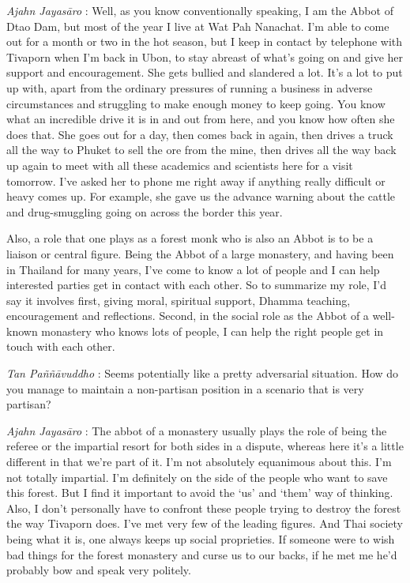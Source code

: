 \emph{Ajahn Jayasāro }: Well, as you know conventionally speaking, I am
the Abbot of Dtao Dam, but most of the year I live at Wat Pah Nanachat.
I'm able to come out for a month or two in the hot season, but I keep in
contact by telephone with Tivaporn when I'm back in Ubon, to stay
abreast of what's going on and give her support and encouragement. She
gets bullied and slandered a lot. It's a lot to put up with, apart from
the ordinary pressures of running a business in adverse circumstances
and struggling to make enough money to keep going. You know what an
incredible drive it is in and out from here, and you know how often she
does that. She goes out for a day, then comes back in again, then drives
a truck all the way to Phuket to sell the ore from the mine, then drives
all the way back up again to meet with all these academics and
scientists here for a visit tomorrow. I've asked her to phone me right
away if anything really difficult or heavy comes up. For example, she
gave us the advance warning about the cattle and drug-smuggling going on
across the border this year.

Also, a role that one plays as a forest monk who is also an Abbot is to
be a liaison or central figure. Being the Abbot of a large monastery,
and having been in Thailand for many years, I've come to know a lot of
people and I can help interested parties get in contact with each other.
So to summarize my role, I'd say it involves first, giving moral,
spiritual support, Dhamma teaching, encouragement and reflections.
Second, in the social role as the Abbot of a well-known monastery who
knows lots of people, I can help the right people get in touch with each
other.

\emph{Tan Paññāvuddho} : Seems potentially like a pretty adversarial
situation. How do you manage to maintain a non-partisan position in a
scenario that is very partisan?

\emph{Ajahn Jayasāro }: The abbot of a monastery usually plays the role
of being the referee or the impartial resort for both sides in a
dispute, whereas here it's a little different in that we're part of it.
I'm not absolutely equanimous about this. I'm not totally impartial. I'm
definitely on the side of the people who want to save this forest. But I
find it important to avoid the `us' and `them' way of thinking. Also, I
don't personally have to confront these people trying to destroy the
forest the way Tivaporn does. I've met very few of the leading figures.
And Thai society being what it is, one always keeps up social
proprieties. If someone were to wish bad things for the forest monastery
and curse us to our backs, if he met me he'd probably bow and speak very
politely.

